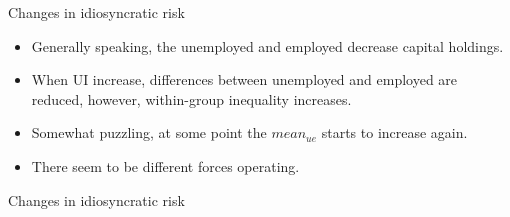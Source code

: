 \documentclass{beamer}
\begin{document}
\begin{frame}{Changes in idiosyncratic risk}

\begin{itemize} 


	\item {
Generally speaking, the unemployed and employed decrease capital holdings. 
}
	\item {
 When UI increase, differences between unemployed and employed are reduced, however, within-group inequality increases.
}
	\item {
Somewhat puzzling, at some point the $mean_{ue}$ starts to increase again.
}
	\item {
There seem to be different forces operating. 
}

\end{itemize}


\end{frame}






\begin{frame}{Changes in idiosyncratic risk}




\end{frame}
\end{document}
